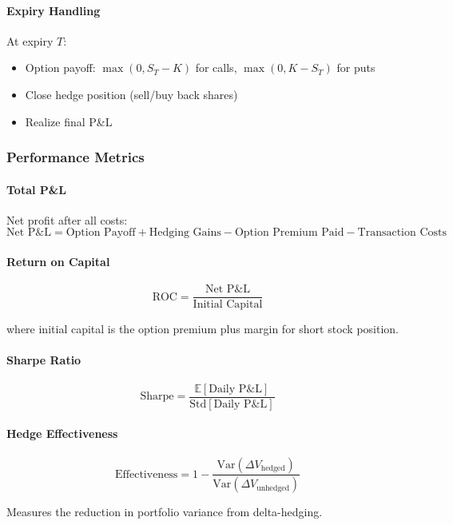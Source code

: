 \paragraph{Expiry Handling}

At expiry $T$:
\begin{itemize}
  \item Option payoff: $\max(0, S_T - K)$ for calls, $\max(0, K - S_T)$ for puts
  \item Close hedge position (sell/buy back shares)
  \item Realize final P\&L
\end{itemize}

\subsubsection{Performance Metrics}

\paragraph{Total P\&L}

Net profit after all costs:
\[
\text{Net P\&L} = \text{Option Payoff} + \text{Hedging Gains} - \text{Option Premium Paid} - \text{Transaction Costs}
\]

\paragraph{Return on Capital}

\[
\text{ROC} = \frac{\text{Net P\&L}}{\text{Initial Capital}}
\]

where initial capital is the option premium plus margin for short stock position.

\paragraph{Sharpe Ratio}

\[
\text{Sharpe} = \frac{\mathbb{E}[\text{Daily P\&L}]}{\text{Std}[\text{Daily P\&L}]}
\]

\paragraph{Hedge Effectiveness}

\[
\text{Effectiveness} = 1 - \frac{\text{Var}(\Delta V_{\text{hedged}})}{\text{Var}(\Delta V_{\text{unhedged}})}
\]

Measures the reduction in portfolio variance from delta-hedging.


